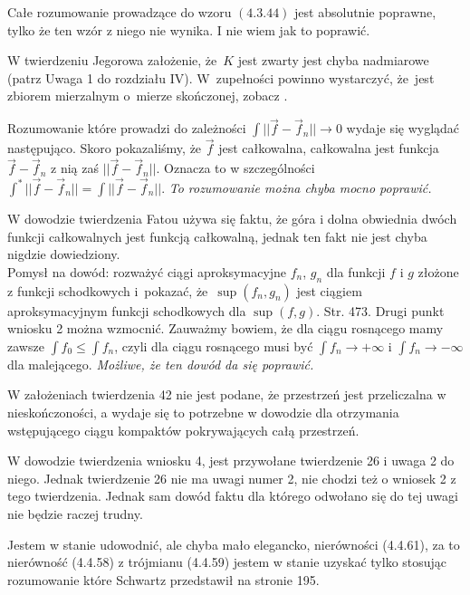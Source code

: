 \documentclass[a4paper,11pt]{article}
\newcommand{\ra}{\rightarrow}
\begin{document}
\start {} Całe rozumowanie prowadzące do wzoru $(4.3.44)$ jest
absolutnie poprawne, tylko że ten wzór z niego nie wynika. I nie wiem
jak to poprawić.

\start {} W twierdzeniu Jegorowa założenie, że~$K$ jest zwarty
jest chyba nadmiarowe (patrz Uwaga 1 do rozdziału IV). W~zupełności
powinno wystarczyć, że~jest zbiorem mierzalnym o~mierze skończonej,
zobacz \cite{Rud86}.

\start {} Rozumowanie które prowadzi do zależności
$\int || \vec{ f } - \vec{ f }_{ n } || \rightarrow 0$ wydaje się
wyglądać następująco. Skoro pokazaliśmy, że $\vec{ f }$ jest
całkowalna, całkowalna jest funkcja $\vec{ f } - \vec{ f }_{ n }$ z
nią zaś $|| \vec{ f } - \vec{ f }_{ n } ||$. Oznacza to w
szczególności
$\int^{ * } || \vec{ f } - \vec{ f }_{ n } || = \int || \vec{ f } -
\vec{ f }_{ n } ||$. \emph{To rozumowanie można chyba mocno poprawić.}

\start {} W dowodzie twierdzenia Fatou używa się faktu, że góra
i dolna obwiednia dwóch funkcji całkowalnych jest funkcją
całkowalną, jednak ten fakt nie jest chyba nigdzie dowiedziony.\\
Pomysł na dowód: rozważyć ciągi aproksymacyjne $f_{ n }$, $g_{ n }$
dla funkcji $f$ i $g$ złożone z funkcji schodkowych i~pokazać,
że~$\sup( f_{ n }, g_{ n } )$ jest ciągiem aproksymacyjnym funkcji
schodkowych dla $\sup( f, g )$. \start Str. 473. Drugi punkt wniosku 2
można wzmocnić. Zauważmy bowiem, że dla ciągu rosnącego mamy zawsze
$\int f_{ 0 } \leq \int f_{ n }$, czyli dla ciągu rosnącego musi być
$\int f_{ n } \ra +\infty$ i $\int f_{ n } \ra -\infty$ dla
malejącego. \emph{Możliwe, że ten dowód da się poprawić.}

\start {} W założeniach twierdzenia 42 nie jest podane, że
przestrzeń jest przeliczalna w nieskończoności, a wydaje się to
potrzebne w dowodzie dla otrzymania wstępującego ciągu kompaktów
pokrywających całą przestrzeń.

\start {} W dowodzie twierdzenia wniosku 4, jest przywołane
twierdzenie 26 i uwaga 2 do niego. Jednak twierdzenie 26 nie ma uwagi
numer 2, nie chodzi też o wniosek 2 z tego twierdzenia. Jednak sam
dowód faktu dla którego odwołano się do tej uwagi nie będzie raczej
trudny.

\start {} Jestem w stanie udowodnić, ale chyba mało elegancko,
nierówności (4.4.61), za to nierówność (4.4.58) z trójmianu (4.4.59)
jestem w stanie uzyskać tylko stosując rozumowanie które Schwartz
przedstawił na stronie 195.
\end{document}
